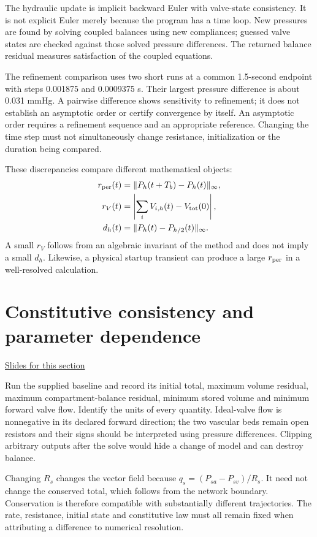 \documentclass[11pt,letterpaper]{article}
\theoremstyle{definition}\newtheorem{definition}{Definition}\newtheorem{example}{Example}
\numberwithin{equation}{section}
\begin{document}
The hydraulic update is implicit backward Euler with valve-state consistency. It is not explicit Euler merely because the program has a time loop. New pressures are found by solving coupled balances using new compliances; guessed valve states are checked against those solved pressure differences. The returned balance residual measures satisfaction of the coupled equations.

The refinement comparison uses two short runs at a common 1.5-second endpoint with steps 0.001875 and 0.0009375 s. Their largest pressure difference is about 0.031 mmHg. A pairwise difference shows sensitivity to refinement; it does not establish an asymptotic order or certify convergence by itself. An asymptotic order requires a refinement sequence and an appropriate reference. Changing the time step must not simultaneously change resistance, initialization or the duration being compared.

These discrepancies compare different mathematical objects:
\[
 \begin{aligned}
 r_{\rm per}(t)&=\|P_h(t+T_b)-P_h(t)\|_\infty,\\
 r_V(t)&=\left|\sum_iV_{i,h}(t)-V_{\rm tot}(0)\right|,\\
 d_h(t)&=\|P_h(t)-P_{h/2}(t)\|_\infty.
 \end{aligned}
\]
A small $r_V$ follows from an algebraic invariant of the method and does not imply a small $d_h$. Likewise, a physical startup transient can produce a large $r_{\rm per}$ in a well-resolved calculation.
\section{Constitutive consistency and parameter dependence}
\hypertarget{note-constitutive-consistency-and-parameter-dependence}{}\label{note:constitutive-consistency-and-parameter-dependence}
{\small \href{slides.html\#frame=resistance-changes-the-dynamics\&step=1}{Slides for this section}}\par
Run the supplied baseline and record its initial total, maximum volume residual, maximum compartment-balance residual, minimum stored volume and minimum forward valve flow. Identify the units of every quantity. Ideal-valve flow is nonnegative in its declared forward direction; the two vascular beds remain open resistors and their signs should be interpreted using pressure differences. Clipping arbitrary outputs after the solve would hide a change of model and can destroy balance.

Changing $R_s$ changes the vector field because $q_s=(P_{sa}-P_{sv})/R_s$. It need not change the conserved total, which follows from the network boundary. Conservation is therefore compatible with substantially different trajectories. The rate, resistance, initial state and constitutive law must all remain fixed when attributing a difference to numerical resolution.
\bigskip
\end{document}
